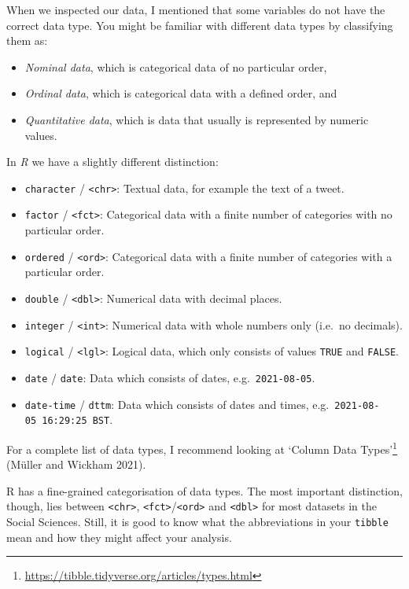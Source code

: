 \documentclass[
  letterpaper,
]{krantz}
\renewcommand{\href}[2]{#2\footnote{\url{#1}}}
\begin{document}
When we inspected our data, I mentioned that some variables do not have
the correct data type. You might be familiar with different data types
by classifying them as:

\begin{itemize}
\item
  \emph{Nominal data}, which is categorical data of no particular order,
\item
  \emph{Ordinal data}, which is categorical data with a defined order,
  and
\item
  \emph{Quantitative data}, which is data that usually is represented by
  numeric values.
\end{itemize}

In \emph{R} we have a slightly different distinction:

\begin{itemize}
\item
  \texttt{character} / \texttt{\textless{}chr\textgreater{}}: Textual
  data, for example the text of a tweet.
\item
  \texttt{factor} / \texttt{\textless{}fct\textgreater{}}: Categorical
  data with a finite number of categories with no particular order.
\item
  \texttt{ordered} / \texttt{\textless{}ord\textgreater{}}: Categorical
  data with a finite number of categories with a particular order.
\item
  \texttt{double} / \texttt{\textless{}dbl\textgreater{}}: Numerical
  data with decimal places.
\item
  \texttt{integer} / \texttt{\textless{}int\textgreater{}}: Numerical
  data with whole numbers only (i.e.~no decimals).
\item
  \texttt{logical} / \texttt{\textless{}lgl\textgreater{}}: Logical
  data, which only consists of values \texttt{TRUE} and \texttt{FALSE}.
\item
  \texttt{date} / \texttt{date}: Data which consists of dates,
  e.g.~\texttt{2021-08-05}.
\item
  \texttt{date-time} / \texttt{dttm}: Data which consists of dates and
  times, e.g.~\texttt{2021-08-05\ 16:29:25\ BST}.
\end{itemize}

For a complete list of data types, I recommend looking at
\href{https://tibble.tidyverse.org/articles/types.html}{`Column Data
Types'} (Müller and Wickham 2021).

R has a fine-grained categorisation of data types. The most important
distinction, though, lies between \texttt{\textless{}chr\textgreater{}},
\texttt{\textless{}fct\textgreater{}}/\texttt{\textless{}ord\textgreater{}}
and \texttt{\textless{}dbl\textgreater{}} for most datasets in the
Social Sciences. Still, it is good to know what the abbreviations in
your \texttt{tibble} mean and how they might affect your analysis.
\end{document}
